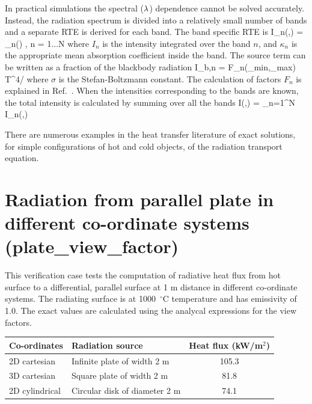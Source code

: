 \documentclass[11pt]{book}
\begin{document}
In practical simulations the spectral ($\lambda$) dependence cannot be solved
accurately. Instead, the radiation spectrum is divided into
a relatively small number of bands and a separate RTE is derived for
each band. The band specific RTE is
\be   \bs \cdot \nabla I_n(\bx,\bs) = \kappa_n(\bx) \;
        \left[ I_{b,n}(\bx) - I_n(\bx,\bs) \right],\;\; n = 1...N
\label{bandRTE} \ee
where $I_n$ is the intensity integrated over the band $n$, and $\kappa_n$
is the appropriate mean absorption coefficient inside the band. The
source term can be written as a fraction of the blackbody radiation
\be I_{b,n} = F_n(\la_{\rm min},\la_{\rm max}) \; \sigma \; T^4/\pi \ee
where $\sigma$ is the Stefan-Boltzmann constant.
The calculation of factors $F_n$ is explained in Ref.~\cite{Siegel:1}.
When the intensities corresponding to the bands are known, the total
intensity is calculated by summing over all the bands
\be I(\bx,\bs) = \sum_{n=1}^N I_n(\bx,\bs) \ee

There are numerous examples in the heat transfer literature of exact solutions, for simple configurations of hot and cold objects, of the radiation
transport equation.

\clearpage

\section{Radiation from parallel plate in different co-ordinate systems \\
(\texorpdfstring{{\bf plate\_view\_factor}}{plate\_view\_factor}) }
\label{plate_view_factor}


This verification case tests the computation of radiative heat flux from hot surface to a differential, parallel surface at 1 m distance
in different co-ordinate systems. The radiating surface is at 1000~$^\circ$C temperature and has emissivity of 1.0.  The exact values are
calculated using the analycal expressions for the view factors.
\begin{center}
\begin{tabular}{|l|l|c|}
\hline Co-ordinates & Radiation source & Heat flux (kW/m$^2$)  \\ \hline \hline
2D cartesian   & Infinite plate of width 2 m   & 105.3 \\
3D cartesian   & Square plate of width 2 m     & 81.8 \\
2D cylindrical & Circular disk of diameter 2 m & 74.1 \\ \hline
\end{tabular}
\end{center}
\end{document}
